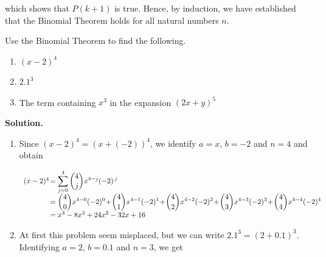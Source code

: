 \documentclass{ximera}
\begin{document}
which shows that $P(k+1)$ is true.  Hence, by induction, we have established that the Binomial Theorem holds for all natural numbers $n$.

\begin{example} \label{binomialthmex}  Use the Binomial Theorem to find the following.

\begin{enumerate}

\item  $(x-2)^4$

\item  $2.1^{3}$


\item  The term containing $x^3$ in the expansion $(2x+y)^{5}$

\end{enumerate}

{\bf Solution.}
\begin{enumerate}
\item  Since $(x-2)^4 = (x+(-2))^4$, we identify $a = x$, $b = -2$ and $n=4$ and obtain

\[ \begin{array}{rcl}

(x-2)^4\! &\hspace{-.1in} =  & \hspace{-.1in}\displaystyle{\sum_{j=0}^{4} \binom{4}{j} x^{4-j} (-2)^{\, j}} \\  
        & \hspace{-.1in} =  & \hspace{-.1in}\displaystyle{\binom{4}{0} x^{4-0} (-2)^{0} \!+\! \binom{4}{1} x^{4-1} (-2)^{1} \!+\! \binom{4}{2} x^{4-2} (-2)^{2} \!+\! \binom{4}{3} x^{4-3} (-2)^{3} \!+\! \binom{4}{4} x^{4-4} (-2)^{4}} \\  
        &\hspace{-.1in}  =  & \hspace{-.1in}x^4 -8x^3 + 24x^2 - 32x + 16 \\
\end{array} \]

\item  At first this problem seem misplaced, but we can write $2.1^{3} = (2 + 0.1)^3$.  Identifying $a =2$, $b = 0.1$ and $n=3$, we get

\[ \begin{array}{rcl}


\end{array}\]
\end{enumerate}
\end{example}
\end{document}
